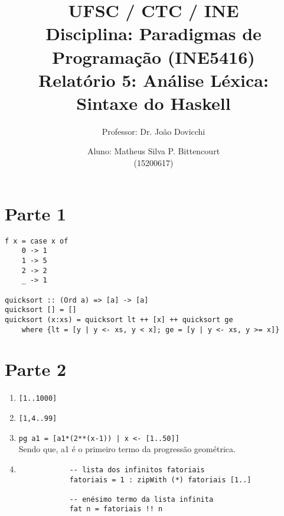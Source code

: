 \documentclass[letterpaper,twocolumn,10pt]{article}
\begin{document}
\title{
	\large \rm UFSC / CTC / INE\\
	\large \rm Disciplina: Paradigmas de Programação (INE5416)\\
	\Large \bf Relatório 5: Análise Léxica: Sintaxe do Haskell
}

\author{
	Professor: Dr. João Dovicchi\\
	\and
	Aluno: Matheus Silva P. Bittencourt\\(15200617)
}

\maketitle

\thispagestyle{empty} %

\section*{Parte 1}

\begin{verbatim}
f x = case x of
	0 -> 1
	1 -> 5
	2 -> 2
	_ -> 1

quicksort :: (Ord a) => [a] -> [a]
quicksort [] = []
quicksort (x:xs) = quicksort lt ++ [x] ++ quicksort ge
	where {lt = [y | y <- xs, y < x]; ge = [y | y <- xs, y >= x]}
\end{verbatim}

\section*{Parte 2}

\begin{enumerate}
	\item \verb$[1..1000]$
	\item \verb$[1,4..99]$
	\item \verb$pg a1 = [a1*(2**(x-1)) | x <- [1..50]]$\\
		Sendo que, a1 é o primeiro termo da progressão geométrica.
	\item
		\begin{verbatim}
			-- lista dos infinitos fatoriais
			fatoriais = 1 : zipWith (*) fatoriais [1..]

			-- enésimo termo da lista infinita
			fat n = fatoriais !! n
		\end{verbatim}
\end{enumerate}
\end{document}
